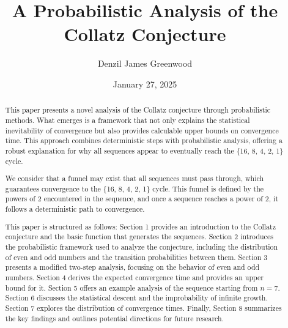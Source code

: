 \documentclass[12pt]{extarticle} %
\title{A Probabilistic Analysis of the Collatz Conjecture}
\author{Denzil James Greenwood}
\date{January 27, 2025}
\begin{document}
\maketitle

\begin{abstract}
This paper presents a novel analysis of the Collatz conjecture through probabilistic methods. What emerges is a framework that not only explains the statistical inevitability of convergence but also provides calculable upper bounds on convergence time. This approach combines deterministic steps with probabilistic analysis, offering a robust explanation for why all sequences appear to eventually reach the \{16, 8, 4, 2, 1\} cycle.

We consider that a funnel may exist that all sequences must pass through, which guarantees convergence to the \{16, 8, 4, 2, 1\} cycle. This funnel is defined by the powers of 2 encountered in the sequence, and once a sequence reaches a power of 2, it follows a deterministic path to convergence.

This paper is structured as follows: Section 1 provides an introduction to the Collatz conjecture and the basic function that generates the sequences. Section 2 introduces the probabilistic framework used to analyze the conjecture, including the distribution of even and odd numbers and the transition probabilities between them. Section 3 presents a modified two-step analysis, focusing on the behavior of even and odd numbers. Section 4 derives the expected convergence time and provides an upper bound for it. Section 5 offers an example analysis of the sequence starting from \( n = 7 \). Section 6 discusses the statistical descent and the improbability of infinite growth. Section 7 explores the distribution of convergence times. Finally, Section 8 summarizes the key findings and outlines potential directions for future research.
\end{abstract}










\end{document}
